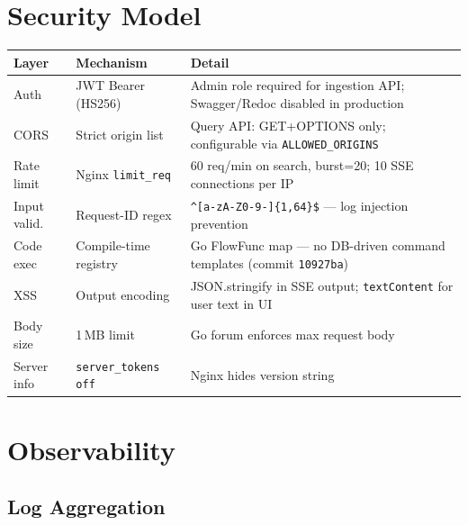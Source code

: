 \documentclass[11pt,a4paper]{article}
\begin{document}
\section{Security Model}

\begin{longtable}{@{}lp{4cm}p{6.5cm}@{}}
\toprule
\textbf{Layer} & \textbf{Mechanism} & \textbf{Detail} \\
\midrule
\endhead
Auth          & JWT Bearer (HS256)        & Admin role required for ingestion API;
                                            Swagger/Redoc disabled in production \\
CORS          & Strict origin list        & Query API: GET+OPTIONS only;
                                            configurable via \texttt{ALLOWED\_ORIGINS} \\
Rate limit    & Nginx \texttt{limit\_req} & 60 req/min on search, burst=20;
                                            10 SSE connections per IP \\
Input valid.  & Request-ID regex          & \texttt{\^{}[a-zA-Z0-9-]\{1,64\}\$} --- log injection
                                            prevention \\
Code exec     & Compile-time registry     & Go FlowFunc map --- no DB-driven command
                                            templates (commit \texttt{10927ba}) \\
XSS           & Output encoding           & JSON.stringify in SSE output;
                                            \texttt{textContent} for user text in UI \\
Body size     & 1\,MB limit               & Go forum enforces max request body \\
Server info   & \texttt{server\_tokens off} & Nginx hides version string \\
\bottomrule
\end{longtable}

\section{Observability}

\subsection{Log Aggregation}
\end{document}
